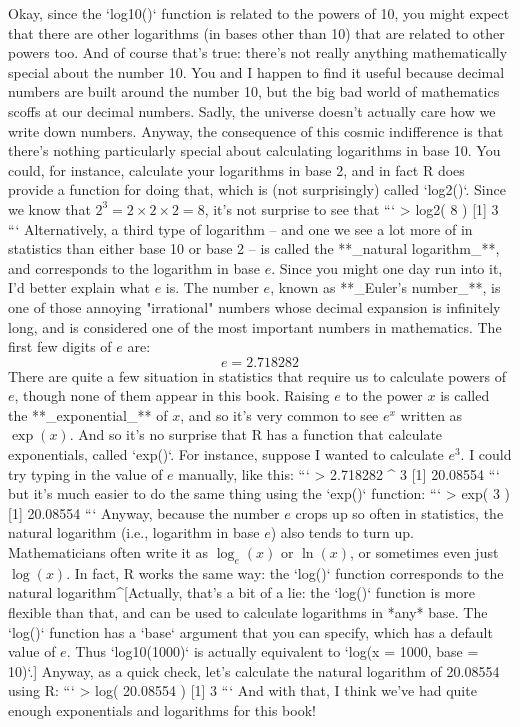 Okay, since the `log10()` function is related to the powers of 10, you might expect that there are other logarithms (in bases other than 10) that are related to other powers too. And of course that's true: there's not really anything mathematically special about the number 10. You and I happen to find it useful because decimal numbers are built around the number 10, but the big bad world of mathematics scoffs at our decimal numbers. Sadly, the universe doesn't actually care how we write down numbers. Anyway, the consequence of this cosmic indifference is that there's nothing particularly special about calculating logarithms in base 10. You could, for instance, calculate your logarithms in base 2, and in fact R does provide a function for doing that, which is (not surprisingly) called `log2()`. Since we know that $2^3 = 2 \times 2 \times 2 = 8$, it's not surprise to see that 
```
> log2( 8 )
[1] 3
```
Alternatively, a third type of logarithm -- and one we see a lot more of in statistics than either base 10 or base 2 -- is called the **_natural logarithm_**, and corresponds to the logarithm in base $e$. Since you might one day run into it, I'd better explain what $e$ is. The number $e$, known as **_Euler's number_**, is one of those annoying "irrational" numbers whose decimal expansion is infinitely long, and is considered one of the most important numbers in mathematics. The first few digits of $e$ are:
$$
e = 2.718282 
$$ 
There are quite a few situation in statistics that require us to calculate powers of $e$, though none of them appear in this book. Raising $e$ to the power $x$ is called the **_exponential_** of $x$, and so it's very common to see $e^x$ written as $\exp(x)$. And so it's no surprise that R has a function that calculate exponentials, called `exp()`. For instance, suppose I wanted to calculate $e^3$. I could try typing in the value of $e$ manually, like this:
```
> 2.718282 ^ 3
[1] 20.08554
```
but it's much easier to do the same thing using the `exp()` function:
```
> exp( 3 )
[1] 20.08554
```
Anyway, because the number $e$ crops up so often in statistics, the natural logarithm (i.e., logarithm in base $e$) also tends to turn up. Mathematicians often write it as $\log_e(x)$ or $\ln(x)$, or sometimes even just $\log(x)$. In fact, R works the same way: the `log()` function corresponds to the natural logarithm^[Actually, that's a bit of a lie: the `log()` function is more flexible than that, and can be used to calculate logarithms in *any* base. The `log()` function has a `base` argument that you can specify, which has a default value of $e$. Thus `log10(1000)` is actually equivalent to  `log(x = 1000, base = 10)`.] Anyway, as a quick check, let's calculate the natural logarithm of 20.08554 using R:
```
> log( 20.08554 )
[1] 3
```
And with that, I think we've had quite enough exponentials and logarithms for this book! 


